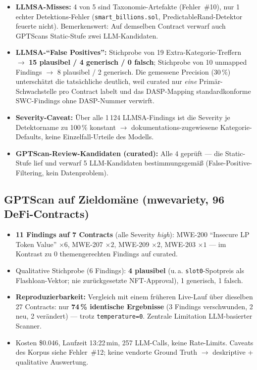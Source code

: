\documentclass[11pt,a4paper]{scrartcl}
\newcommand{\code}[1]{\texttt{#1}}
\begin{document}
\begin{itemize}[nosep]
  \item \textbf{LLMSA-Misses:} 4 von 5 sind Taxonomie-Artefakte (Fehler~\#10), nur 1 echter Detektions-Fehler (\code{smart\_billions.sol}, PredictableRand-Detektor feuerte nicht). Bemerkenswert: Auf demselben Contract verwarf auch GPTScans Static-Stufe zwei LLM-Kandidaten.
  \item \textbf{LLMSA-\enquote{False Positives}:} Stichprobe von 19 Extra-Kategorie-Treffern $\rightarrow$ \textbf{15 plausibel / 4 generisch / 0 falsch}; Stichprobe von 10 unmapped Findings $\rightarrow$ 8 plausibel / 2 generisch. Die gemessene Precision (30\,\%) unterschätzt die tatsächliche deutlich, weil curated nur \emph{eine} Primär-Schwachstelle pro Contract labelt und das DASP-Mapping standardkonforme SWC-Findings ohne DASP-Nummer verwirft.
  \item \textbf{Severity-Caveat:} Über alle 1\,124 LLMSA-Findings ist die Severity je Detektorname zu 100\,\% konstant $\rightarrow$ dokumentations-zugewiesene Kategorie-Defaults, keine Einzelfall-Urteile des Modells.
  \item \textbf{GPTScan-Review-Kandidaten (curated):} Alle 4 geprüft --- die Static-Stufe lief und verwarf 5 LLM-Kandidaten bestimmungsgemäß (False-Positive-Filtering, kein Datenproblem).
\end{itemize}

\subsection{GPTScan auf Zieldomäne (mwevariety, 96 DeFi-Contracts)}

\begin{itemize}[nosep]
  \item \textbf{11 Findings auf 7 Contracts} (alle Severity \emph{high}): MWE-200 \enquote{Insecure LP Token Value} $\times 6$, MWE-207 $\times 2$, MWE-209 $\times 2$, MWE-203 $\times 1$ --- im Kontrast zu 0 themengerechten Findings auf curated.
  \item Qualitative Stichprobe (6 Findings): \textbf{4 plausibel} (u.\,a. \code{slot0}-Spotpreis als Flashloan-Vektor; nie zurückgesetzte NFT-Approval), 1 generisch, 1 falsch.
  \item \textbf{Reproduzierbarkeit:} Vergleich mit einem früheren Live-Lauf über dieselben 27 Contracts: nur \textbf{74\,\% identische Ergebnisse} (3 Findings verschwunden, 2 neu, 2 verändert) --- trotz \code{temperature=0}. Zentrale Limitation LLM-basierter Scanner.
  \item Kosten \$0.046, Laufzeit 13:22\,min, 257 LLM-Calls, keine Rate-Limits. Caveats des Korpus siehe Fehler~\#12; keine vendorte Ground Truth $\rightarrow$ deskriptive + qualitative Auswertung.
\end{itemize}
\end{document}
